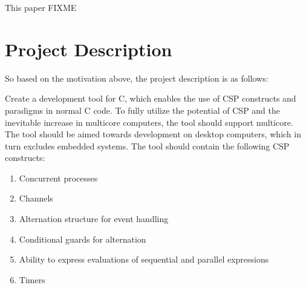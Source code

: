 This paper FIXME


\section{Project Description}
\label{sec:project_description}

So based on the motivation above, the project description is as follows:

Create a development tool for C, which enables the use of CSP constructs and paradigms in normal C code. To fully utilize the potential of CSP and the inevitable increase in multicore computers, the tool should support multicore. The tool should be aimed towards development on desktop computers, which in turn excludes embedded systems. The tool should contain the following CSP constructs:

\begin{enumerate}
    \item Concurrent processes
    \item Channels
    \item Alternation structure for event handling
    \item Conditional guards for alternation
    \item Ability to express evaluations of sequential and parallel expressions
    \item Timers
\end{enumerate}

